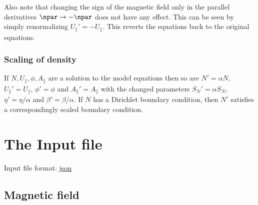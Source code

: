 Also note that changing the sign of the magnetic field only in the parallel derivatives $\npar \rightarrow -\npar$ does not
have any effect. This can be seen by simply renormalizing $U_\parallel'=-U_\parallel$. This reverts the equations back to the original equations.
\subsubsection{Scaling of density}
If $N, U_\parallel, \phi, A_\parallel$ are a solution to the model equations
then so are $N'=\alpha N$, $U_\parallel'=U_\parallel$, $\phi'=\phi$ and $A_\parallel'=A_\parallel$ with the changed parameters $S_N' = \alpha S_N$, $\eta' = \eta/\alpha$ and $ \beta' = \beta/\alpha$. If $N$
has a Dirichlet boundary condition, then $N'$ satisfies a correspondingly scaled boundary condition.

\section{The Input file} \label{sec:input_file}
Input file format: \href{https://en.wikipedia.org/wiki/JSON}{json}

\subsection{Magnetic field} \label{sec:geometry_file}

